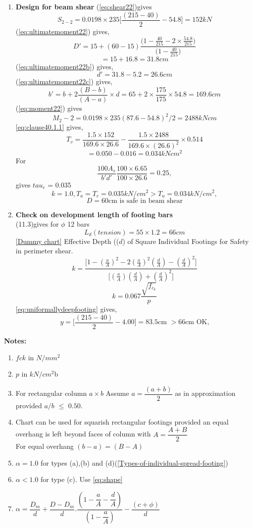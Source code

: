 \begin{enumerate}
\item  \textbf{Design for beam shear}
  \equmacro (\ref{eq:shear22})gives
  $$S_{2-2}=0.0198\times235\Bigg[\frac{(215-40)}{2}-54.8\Bigg]=152 kN$$
  \equmacro (\ref{eq:ultimatemoment22}) gives,
  $$D'=15+(60-15)\frac{\Bigg(1-\frac{40}{215}-2\times \frac{54.8}{215}\Bigg)}{\Bigg(1-\frac{40}{215}\Bigg)}$$
  $$=15+16.8=31.8 cm$$
  \equmacro (\ref{eq:ultimatemoment22b}) gives,
  $$ d'=31.8-5.2=26.6 cm$$
 \equmacro (\ref{eq:ultimatemoment22c}) gives,
  $$b'=b+2\frac{(B-b)}{(A-a)}\times d=65+2\times \frac{175}{175}\times 54.8=169.6 cm$$
  \equmacro (\ref{eq:moment22}) gives
  $$M_2-2=0.0198\times 235(87.6-54.8)^2/2=2488 kN cm$$ 
  \equmacro \ref{eq:clause40.1.1} gives,
  $$T_v=\frac{1.5\times 152}{169.6\times26.6}-\frac{1.5\times 2488}{169.6\times (26.6)^2}\times 0.514$$
  $$=0.050-0.016=0.034 kN cm^2$$
  For
  $$\frac{100A_s}{b'd'}\frac{100\times6.65}{100\times26.6}=0.25,$$
   gives ${tau_c}$ = 0.035 
  $$k=1.0,  T_a=T_c=0.035 kN/cm^2>T_u=0.034 kN/cm^2,$$
$$D=60 \text{cm is safe in beam shear}$$  
  
\item  \textbf{Check on development length of footing bars}\\
\tablemacro (11.3)gives for $\phi$ 12 bars
$$L_d(tension)=55\times1.2=66cm$$
\chartmacro \ref{Dummy chart} Effective Depth (($d$) of Square Individual Footings for Safety in perimeter shear.
$$k=\frac{\Bigg[1-\left(\frac{a}{A}\right)^2
-2\left(\frac{a}{A}\right)^2\left( \frac{d}{A}\right)-\left(\frac{d}{A}\right)^2\Bigg]}{\Bigg[\left(\frac{a}{A}\right)\left(\frac{d}{A}\right)+\left(\frac{d}{A}\right)^2\Bigg]}$$
$$k=0.067\frac{\sqrt{f_c_k}}{p}$$
\equmacro \ref{eq:uniformallydeepfooting} gives,
$$y=\Bigg[\frac{(215-40)}{2}-4.00\Bigg]=83.5 \text{cm } > 66 \text{cm OK,}$$
\end{enumerate}

\textbf{Notes:}
\begin{enumerate}
\item  $fck$ in $N/mm^2$
\item $p$ in $kN/cm^2$b
\item For rectangular column $a\times b$
Assume $a=\dfrac{(a+b)}{2}$ as in approximation provided $a/b$ $\leq$ $0.50.$
\item Chart can be used for squarish rectangular footings provided an equal overhang is left beyond faces of column with $A=\dfrac{A+B}{2}$\\
For equal overhang $(b-a)=(B-A)$
\item $\alpha=1.0$ for types (a),(b) and (d)(\figmacro \ref{Types-of-individual-spread-footing})
\item $\alpha<1.0$ for type (c). Use \equmacro \ref{eq:shape}
\item $\alpha=\dfrac{D_m}{d}+\dfrac{D-D_m}{d}.\dfrac{\left(1-\dfrac{a}{A}-\dfrac{d}{A}\right)}{\left(1-\dfrac{a}{A}\right)}-\dfrac{(c+\phi)}{d}$
\end{enumerate}

